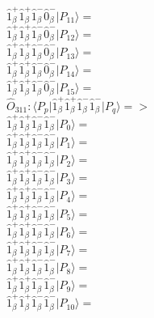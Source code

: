 \documentclass[14pt]{article}
\begin{document}
    $ \hat{1}_{\beta}^{+}\hat{1}_{\beta}^{+}\hat{1}_{\beta}^{-}\hat{0}_{\beta}^{-} \vert{P_{11}}\rangle =  $ \\ 
    $ \hat{1}_{\beta}^{+}\hat{1}_{\beta}^{+}\hat{1}_{\beta}^{-}\hat{0}_{\beta}^{-} \vert{P_{12}}\rangle =  $ \\ 
    $ \hat{1}_{\beta}^{+}\hat{1}_{\beta}^{+}\hat{1}_{\beta}^{-}\hat{0}_{\beta}^{-} \vert{P_{13}}\rangle =  $ \\ 
    $ \hat{1}_{\beta}^{+}\hat{1}_{\beta}^{+}\hat{1}_{\beta}^{-}\hat{0}_{\beta}^{-} \vert{P_{14}}\rangle =  $ \\ 
    $ \hat{1}_{\beta}^{+}\hat{1}_{\beta}^{+}\hat{1}_{\beta}^{-}\hat{0}_{\beta}^{-} \vert{P_{15}}\rangle =  $ \\ 
    
    $\hat{O}_{311}:  \langle{P_p}\vert \hat{1}_{\beta}^{+}\hat{1}_{\beta}^{+}\hat{1}_{\beta}^{-}\hat{1}_{\beta}^{-} \vert{P_q}\rangle => $ \\ 
    $ \hat{1}_{\beta}^{+}\hat{1}_{\beta}^{+}\hat{1}_{\beta}^{-}\hat{1}_{\beta}^{-} \vert{P_{0}}\rangle =  $ \\ 
    $ \hat{1}_{\beta}^{+}\hat{1}_{\beta}^{+}\hat{1}_{\beta}^{-}\hat{1}_{\beta}^{-} \vert{P_{1}}\rangle =  $ \\ 
    $ \hat{1}_{\beta}^{+}\hat{1}_{\beta}^{+}\hat{1}_{\beta}^{-}\hat{1}_{\beta}^{-} \vert{P_{2}}\rangle =  $ \\ 
    $ \hat{1}_{\beta}^{+}\hat{1}_{\beta}^{+}\hat{1}_{\beta}^{-}\hat{1}_{\beta}^{-} \vert{P_{3}}\rangle =  $ \\ 
    $ \hat{1}_{\beta}^{+}\hat{1}_{\beta}^{+}\hat{1}_{\beta}^{-}\hat{1}_{\beta}^{-} \vert{P_{4}}\rangle =  $ \\ 
    $ \hat{1}_{\beta}^{+}\hat{1}_{\beta}^{+}\hat{1}_{\beta}^{-}\hat{1}_{\beta}^{-} \vert{P_{5}}\rangle =  $ \\ 
    $ \hat{1}_{\beta}^{+}\hat{1}_{\beta}^{+}\hat{1}_{\beta}^{-}\hat{1}_{\beta}^{-} \vert{P_{6}}\rangle =  $ \\ 
    $ \hat{1}_{\beta}^{+}\hat{1}_{\beta}^{+}\hat{1}_{\beta}^{-}\hat{1}_{\beta}^{-} \vert{P_{7}}\rangle =  $ \\ 
    $ \hat{1}_{\beta}^{+}\hat{1}_{\beta}^{+}\hat{1}_{\beta}^{-}\hat{1}_{\beta}^{-} \vert{P_{8}}\rangle =  $ \\ 
    $ \hat{1}_{\beta}^{+}\hat{1}_{\beta}^{+}\hat{1}_{\beta}^{-}\hat{1}_{\beta}^{-} \vert{P_{9}}\rangle =  $ \\ 
    $ \hat{1}_{\beta}^{+}\hat{1}_{\beta}^{+}\hat{1}_{\beta}^{-}\hat{1}_{\beta}^{-} \vert{P_{10}}\rangle =  $ \\ 
\end{document}
